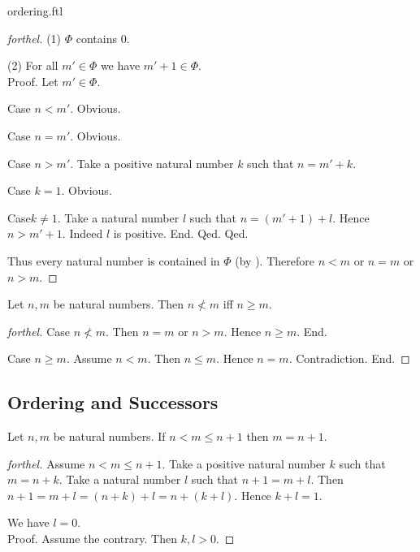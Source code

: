 \documentclass{naproche-library}
\begin{document}
\begin{smodule}{ordering.ftl}
\begin{proof}[forthel]
    (1) $\Phi$ contains $0$.

    (2) For all $m' \in \Phi$ we have $m' + 1 \in \Phi$. \\
    Proof.
      Let $m' \in \Phi$.

      Case $n < m'$. Obvious.

      Case $n = m'$. Obvious.

      Case $n > m'$.
        Take a positive natural number $k$ such that $n = m' + k$.

        Case $k = 1$. Obvious.

        Case$k \neq 1$.
          Take a natural number $l$ such that $n = (m' + 1) + l$.
          Hence $n > m' + 1$.
          Indeed $l$ is positive.
        End.
      Qed.
    Qed.

    Thus every natural number is contained in $\Phi$ (by ).
    Therefore $n < m$ or $n = m$ or $n > m$.
  \end{proof}

  \begin{proposition}[forthel,id=ARITHMETIC_04_6991525988794368]
    Let $n, m$ be natural numbers.
    Then $n \nless m$ iff $n \geq m$.
  \end{proposition}
  \begin{proof}[forthel]
    Case $n \nless m$.
      Then $n = m$ or $n > m$.
      Hence $n \geq m$.
    End.

    Case $n \geq m$.
      Assume $n < m$.
      Then $n \leq m$.
      Hence $n = m$.
      Contradiction.
    End.
  \end{proof}


  \subsection*{Ordering and Successors}

  \begin{proposition}[forthel,id=ARITHMETIC_04_7006203091615744]
    Let $n, m$ be natural numbers.
    If $n < m \leq n + 1$ then $m = n + 1$.
  \end{proposition}
  \begin{proof}[forthel]
    Assume $n < m \leq n + 1$.
    Take a positive natural number $k$ such that $m = n + k$.
    Take a natural number $l$ such that $n + 1 = m + l$.
    Then $n + 1
      = m + l
      = (n + k) + l
      = n + (k + l)$.
    Hence $k + l = 1$.

    We have $l = 0$. \\
    Proof.
      Assume the contrary.
      Then $k,l > 0$.


\end{proof}
\end{smodule}
\end{document}
